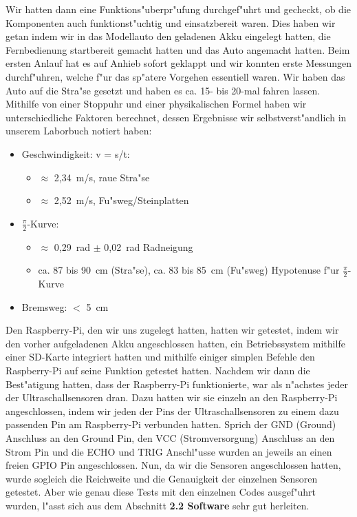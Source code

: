 \documentclass[a4paper,12pt]{article}
\newenvironment{myitemize}{
	\begin{itemize}
		\setlength{\itemsep}{0pt}
		\setlength{\parskip}{0pt}
		\setlength{\parsep}{0pt}
}
{
	\end{itemize}
}
\begin{document}
Wir hatten dann eine Funktions"uberpr"ufung durchgef"uhrt und gecheckt, ob die Komponenten auch funktionst"uchtig und einsatzbereit waren.
Dies haben wir getan indem wir in das Modellauto den geladenen Akku eingelegt hatten, die Fernbedienung startbereit gemacht hatten und das Auto angemacht hatten.
Beim ersten Anlauf hat es auf Anhieb sofort geklappt und wir konnten erste Messungen durchf"uhren, welche f"ur das sp"atere Vorgehen essentiell waren.
Wir haben das Auto auf die Stra"se gesetzt und haben es ca. 15- bis 20-mal fahren lassen.
Mithilfe von einer Stoppuhr und einer physikalischen Formel haben wir unterschiedliche Faktoren berechnet, dessen Ergebnisse wir selbstverst"andlich in unserem Laborbuch notiert haben:

\begin{myitemize}
	\item Geschwindigkeit: v = s/t:
	\begin{myitemize}
		\item $ \approx $ 2,34~m/s, raue Stra"se
		\item $ \approx $ 2,52~m/s, Fu"sweg/Steinplatten
	\end{myitemize}
	\item $ \frac{\pi}{2} $-Kurve:
	\begin{myitemize}
		\item $ \approx $ 0,29~rad $ \pm $ 0,02~rad Radneigung
		\item ca. 87 bis 90~cm (Stra"se), ca. 83 bis 85~cm (Fu"sweg) Hypotenuse f"ur $ \frac{\pi}{2} $-Kurve
	\end{myitemize}
	\item Bremsweg: $ < $ 5~cm
\end{myitemize}

Den Raspberry-Pi, den wir uns zugelegt hatten, hatten wir getestet, indem wir den vorher aufgeladenen Akku angeschlossen hatten, ein Betriebssystem mithilfe einer SD-Karte integriert hatten und mithilfe einiger simplen Befehle den Raspberry-Pi auf seine Funktion getestet hatten. 
Nachdem wir dann die Best"atigung hatten, dass der Raspberry-Pi funktionierte, war als n"achstes jeder der Ultraschallsensoren dran.
Dazu hatten wir sie einzeln an den Raspberry-Pi angeschlossen, indem wir jeden der Pins der Ultraschallsensoren zu einem dazu passenden Pin am Raspberry-Pi verbunden hatten.
Sprich der GND (Ground) Anschluss an den Ground Pin, den VCC (Stromversorgung) Anschluss an den Strom Pin und die ECHO und TRIG Anschl"usse wurden an jeweils an einen freien GPIO Pin angeschlossen.
Nun, da wir die Sensoren angeschlossen hatten, wurde sogleich die Reichweite und die Genauigkeit der einzelnen Sensoren getestet.
Aber wie genau diese Tests mit den einzelnen Codes ausgef"uhrt wurden, l"asst sich aus dem Abschnitt {\bf 2.2 Software} sehr gut herleiten.
\end{document}
